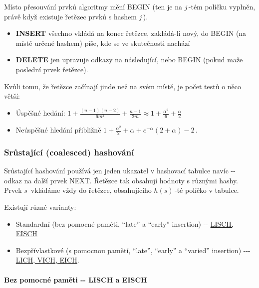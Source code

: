 Místo přesouvání prvků algoritmy mění BEGIN (ten je na \(j\,\!\)-tém
políčku vyplněn, právě když existuje řetězec prvků s hashem \(j\,\!\)).

\begin{itemize}
\tightlist
\item
  \textbf{INSERT} všechno vkládá na konec řetězce, zakládá-li nový, do
  BEGIN (na místě určené hashem) píše, kde se ve skutečnosti nachází
\item
  \textbf{DELETE} jen upravuje odkazy na následující, nebo BEGIN (pokud
  maže poslední prvek řetězce).
\end{itemize}

Kvůli tomu, že řetězce začínají jinde než na svém místě, je počet testů
o něco větší:

\begin{itemize}
\tightlist
\item
  Úspěšné hedání:
  \(1+\frac{(n-1)(n-2)}{6m^2} + \frac{n-1}{2m}\approx 1 + \frac{\alpha^2}{6} + \frac{\alpha}{2}\,\!\)
\item
  Neúspěšné hledání přibližně
  \(1+\frac{\alpha^2}{2}+\alpha+e^{-\alpha}(2+\alpha)-2\,\!\).
\end{itemize}

\subsubsection{Srůstající (coalesced)
hashování}\label{srux16fstajuxedcuxed-coalesced-hashovuxe1nuxed}

Srůstající hashování používá jen jeden ukazatel v hashovací tabulce
navíc -\/- odkaz na další prvek NEXT. Řetězce tak obsahují hodnoty s
různými hashy. Prvek \(s\,\!\) vkládáme vždy do řetězce, obsahujícího
\(h(s)\,\!\)-té políčko v tabulce.

Existují různé varianty:

\begin{itemize}
\tightlist
\item
  Standardní (bez pomocné paměti, ``late'' a ``early'' insertion) -\/-
  \protect\hyperlink{Bez_pomocnuxe9_pamux11bti_--_LISCH_a_EISCH}{LISCH,
  EISCH}
\item
  Bezpřívlastkové (s pomocnou pamětí, ``late'', ``early'' a ``varied''
  insertion) -\/-\/-
  \protect\hyperlink{S_pomocnou_pamux11btuxed_--_LICHux2c_VICHux2c_EICH}{LICH,
  VICH, EICH}.
\end{itemize}

\paragraph{Bez pomocné paměti -\/- LISCH a
EISCH}\label{bez-pomocnuxe9-pamux11bti----lisch-a-eisch}

